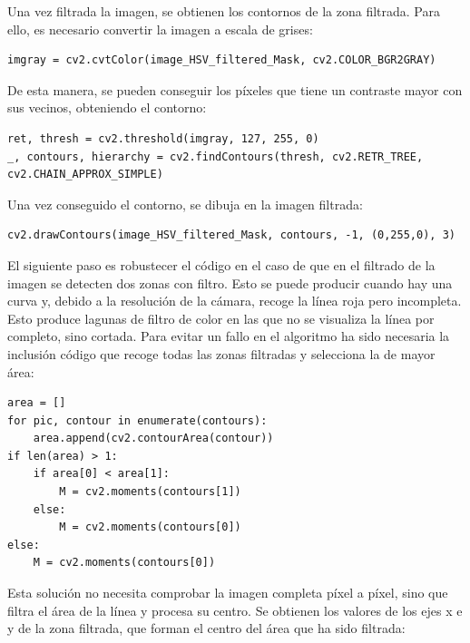 Una vez filtrada la imagen, se obtienen los contornos de la zona filtrada. Para ello, es necesario convertir la imagen a escala de grises:

\lstset{language=Python, breaklines=true, basicstyle=\footnotesize}
\begin{lstlisting}[frame=single]
imgray = cv2.cvtColor(image_HSV_filtered_Mask, cv2.COLOR_BGR2GRAY)
\end{lstlisting}

De esta manera, se pueden conseguir los píxeles que tiene un contraste mayor con sus vecinos, obteniendo el contorno:

\lstset{language=Python, breaklines=true, basicstyle=\footnotesize}
\begin{lstlisting}[frame=single]
ret, thresh = cv2.threshold(imgray, 127, 255, 0)
_, contours, hierarchy = cv2.findContours(thresh, cv2.RETR_TREE, cv2.CHAIN_APPROX_SIMPLE)
\end{lstlisting}

Una vez conseguido el contorno, se dibuja en la imagen filtrada:

\lstset{language=Python, breaklines=true, basicstyle=\footnotesize}
\begin{lstlisting}[frame=single]
cv2.drawContours(image_HSV_filtered_Mask, contours, -1, (0,255,0), 3)
\end{lstlisting}

El siguiente paso es robustecer el código en el caso de que en el filtrado de la imagen se detecten dos zonas con filtro. Esto se puede producir cuando hay una curva y, debido a la resolución de la cámara, recoge la línea roja pero incompleta. Esto produce lagunas de filtro de color en las que no se visualiza la línea por completo, sino cortada. Para evitar un fallo en el algoritmo ha sido necesaria la inclusión código que recoge todas las zonas filtradas y selecciona la de mayor área:

\lstset{language=Python, breaklines=true, basicstyle=\footnotesize}
\begin{lstlisting}[frame=single]
area = []
for pic, contour in enumerate(contours):
    area.append(cv2.contourArea(contour))
if len(area) > 1:
    if area[0] < area[1]:
        M = cv2.moments(contours[1])
    else:
        M = cv2.moments(contours[0])
else:
    M = cv2.moments(contours[0])
\end{lstlisting}

Esta solución no necesita comprobar la imagen completa píxel a píxel, sino que filtra el área de la línea y procesa su centro. Se obtienen los valores de los ejes x e y de la zona filtrada, que forman el centro del área que ha sido filtrada:

